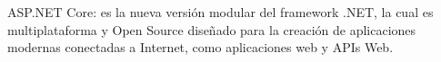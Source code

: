 ASP.NET Core: es la nueva versión modular del framework .NET, la cual es multiplataforma y Open Source diseñado para la creación de aplicaciones modernas conectadas a Internet, como aplicaciones web y APIs Web.
